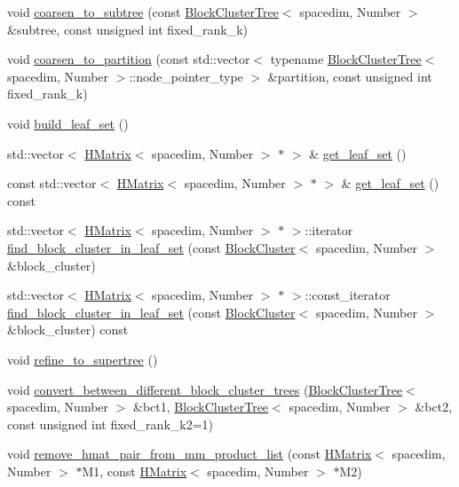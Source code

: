 \begin{DoxyCompactItemize}
\item 
void \hyperlink{classHMatrix_a27c7390b792e6e47ab2861616a997d99}{coarsen\+\_\+to\+\_\+subtree} (const \hyperlink{classBlockClusterTree}{Block\+Cluster\+Tree}$<$ spacedim, Number $>$ \&subtree, const unsigned int fixed\+\_\+rank\+\_\+k)
\item 
void \hyperlink{classHMatrix_a525ad4d453f4f496b98cccb341c8b60b}{coarsen\+\_\+to\+\_\+partition} (const std\+::vector$<$ typename \hyperlink{classBlockClusterTree}{Block\+Cluster\+Tree}$<$ spacedim, Number $>$\+::node\+\_\+pointer\+\_\+type $>$ \&partition, const unsigned int fixed\+\_\+rank\+\_\+k)
\item 
void \hyperlink{classHMatrix_a139f32982527ba981e0211b5663e3b43}{build\+\_\+leaf\+\_\+set} ()
\item 
std\+::vector$<$ \hyperlink{classHMatrix}{H\+Matrix}$<$ spacedim, Number $>$ $\ast$ $>$ \& \hyperlink{classHMatrix_ac5c9102fc04997c1ae3627185379d9bb}{get\+\_\+leaf\+\_\+set} ()
\item 
const std\+::vector$<$ \hyperlink{classHMatrix}{H\+Matrix}$<$ spacedim, Number $>$ $\ast$ $>$ \& \hyperlink{classHMatrix_a851d7bb3632bc1d18538d4d1dd5f6393}{get\+\_\+leaf\+\_\+set} () const
\item 
std\+::vector$<$ \hyperlink{classHMatrix}{H\+Matrix}$<$ spacedim, Number $>$ $\ast$ $>$\+::iterator \hyperlink{classHMatrix_ab0f83de878e6079330ec3c374f587a04}{find\+\_\+block\+\_\+cluster\+\_\+in\+\_\+leaf\+\_\+set} (const \hyperlink{classBlockCluster}{Block\+Cluster}$<$ spacedim, Number $>$ \&block\+\_\+cluster)
\item 
std\+::vector$<$ \hyperlink{classHMatrix}{H\+Matrix}$<$ spacedim, Number $>$ $\ast$ $>$\+::const\+\_\+iterator \hyperlink{classHMatrix_a723cc200afe31148fcc28f0120c5ec54}{find\+\_\+block\+\_\+cluster\+\_\+in\+\_\+leaf\+\_\+set} (const \hyperlink{classBlockCluster}{Block\+Cluster}$<$ spacedim, Number $>$ \&block\+\_\+cluster) const
\item 
void \hyperlink{classHMatrix_ad2b353962226c78910d6ddb6b5b8e460}{refine\+\_\+to\+\_\+supertree} ()
\item 
void \hyperlink{classHMatrix_af6fd60090b0de7bdea52fc84ddeb22c3}{convert\+\_\+between\+\_\+different\+\_\+block\+\_\+cluster\+\_\+trees} (\hyperlink{classBlockClusterTree}{Block\+Cluster\+Tree}$<$ spacedim, Number $>$ \&bct1, \hyperlink{classBlockClusterTree}{Block\+Cluster\+Tree}$<$ spacedim, Number $>$ \&bct2, const unsigned int fixed\+\_\+rank\+\_\+k2=1)
\item 
void \hyperlink{classHMatrix_a9e023f39b1f8916117a63557895a91b4}{remove\+\_\+hmat\+\_\+pair\+\_\+from\+\_\+mm\+\_\+product\+\_\+list} (const \hyperlink{classHMatrix}{H\+Matrix}$<$ spacedim, Number $>$ $\ast$M1, const \hyperlink{classHMatrix}{H\+Matrix}$<$ spacedim, Number $>$ $\ast$M2)

\end{DoxyCompactItemize}
